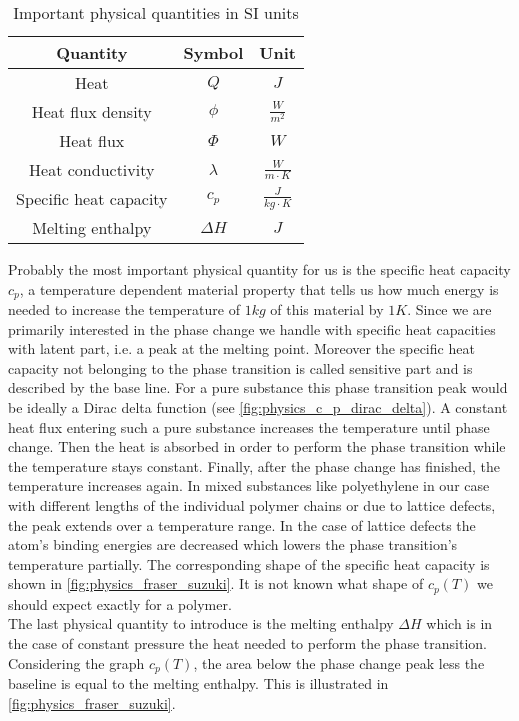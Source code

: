 \documentclass{scrartcl}[12pt, halfparskip]
\numberwithin{equation}{section}
\numberwithin{figure}{section}
\numberwithin{table}{section}
\begin{document}
\begin{table}[H]
	\centering
\begin{tabular}{| c | c | c |} \hline
	Quantity & Symbol & Unit \\ \hline
	Heat & $Q$ & $J$ \\[0.7ex]
	Heat flux density & $\phi$ & $\frac{W}{m^2}$ \\[0.7ex]
	Heat flux & $\varPhi$ & $W$ \\[0.7ex]
	Heat conductivity & $\lambda$ & $\frac{W}{m \cdot K}$ \\[0.7ex]
	Specific heat capacity & $c_p$ & $\frac{J}{kg \cdot K}$ \\[0.7ex]
	Melting enthalpy & $\Delta H$ & $J$ \\ \hline
\end{tabular}
\caption{Important physical quantities in SI units}
\label{tab:important_physical_quantities}
\end{table}



Probably the most important physical quantity for us is the specific heat capacity $c_p$, a temperature dependent material property that tells us how much energy is needed to increase the temperature of $1kg$ of this material by $1K$. 
Since we are primarily interested in the phase change we handle with specific heat capacities with latent part, i.e. a peak at the melting point. Moreover the specific heat capacity not belonging to the phase transition is called sensitive part and is described by the base line. 
For a pure substance this phase transition peak would be ideally a Dirac delta function (see  \cref{fig:physics_c_p_dirac_delta}). A constant heat flux entering such a pure substance increases the temperature until phase change. Then the heat is absorbed in order to perform the phase transition while the temperature stays constant. Finally, after the phase change has finished, the temperature increases again. 
In mixed substances like polyethylene in our case with different lengths of the individual polymer chains or due to lattice defects, the peak extends over a temperature range. In the case of lattice defects the atom's binding energies are decreased which lowers the phase transition's temperature partially. The corresponding shape of the specific heat capacity is shown in \cref{fig:physics_fraser_suzuki}. It is not known what shape of $c_p(T)$ we should expect exactly for a polymer. \\
The last physical quantity to introduce is the melting enthalpy $\Delta H$ which is in the case of constant pressure the heat needed to perform the phase transition. Considering the graph $c_p(T)$, the area below the phase change peak less the baseline is equal to the melting enthalpy. This is illustrated in \cref{fig:physics_fraser_suzuki}.
\end{document}
